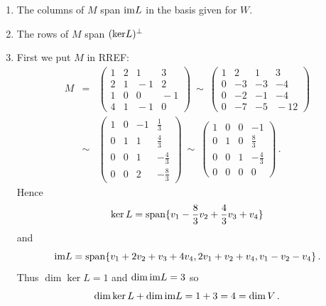 \begin{enumerate}
\begin{enumerate}
\item The columns of $M$ span ${\rm im} L$ in the basis given for $W$.
\item The rows of $M$ span $({\rm ker}L)^\perp$%
\item First we put $M$ in RREF:
\begin{eqnarray*}
M& = & \begin{pmatrix}1&2&1&3\\2&1&\!-1&2\\1&0&0&\!-1\\4&1&\!-1&0\end{pmatrix}
\ \sim\
\begin{pmatrix}1&2&1&3\\0&-3&-3&-4\\0&-2&-1&-4\\0&-7&-5&\!-12\end{pmatrix}\\[2mm]
&\sim& 
\begin{pmatrix}1&0&-1&\frac13\\[1mm]0&1&1&\frac43\\[1mm]0&0&1&-\frac43\\[1mm]0&0&2&-\frac83\end{pmatrix}
\ \sim\ \begin{pmatrix}1&0&0&-1\\[1mm]0&1&0&\frac83\\[1mm]0&0&1&-\frac43\\[1mm]0&0&0&0\end{pmatrix}\, .
\end{eqnarray*}
Hence $$\ker L=\operatorname{span}\{v_1-\frac83v_2+\frac43 v_3+v_4\}$$ and $${\rm im} L=\operatorname{span}\{v_1+2v_2+v_3+4v_4,2v_1+v_2+v_4,v_1-v_2-v_4\}\, .$$
Thus $\dim\ker L=1$ and $\dim{\rm im} L=3$ so $$\dim\ker L+\dim{\rm im} L=1+3=4=\dim V\, .$$
\end{enumerate}


\end{enumerate}
